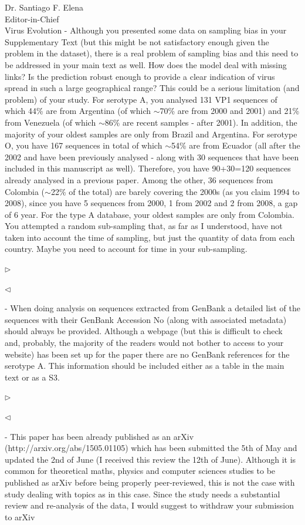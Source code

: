 \documentclass[ucla,biomath,12pt,noaddrfooter,datefrom]{UC_letter}
\newenvironment{reply}{$\triangleright$\bf}{$\triangleleft$}
\begin{document}
\begin{letter}{
Dr. Santiago F. Elena \\
Editor-in-Chief \\
Virus Evolution
}
-       Although you presented some data on sampling bias in your Supplementary Text (but this might be not satisfactory enough given the problem in the dataset), there is a real problem of sampling bias and this need to be addressed in your main text as well. 
How does the model deal with missing links? 
Is the prediction robust enough to provide a clear indication of virus spread in such a large geographical range? 
This could be a serious limitation (and problem) of your study. For serotype A, you analysed 131 VP1 sequences of which 44\% are from Argentina (of which $\sim$70\% are from 2000 and 2001) and 21\% from Venezuela (of which $\sim$86\% are recent samples - after 2001). 
In addition, the majority of your oldest samples are only from Brazil and Argentina. For serotype O, you have 167 sequences in total of which $\sim$54\% are from Ecuador (all after the 2002 and have been previously analysed - along with 30 sequences that have been included in this manuscript as well). 
Therefore, you have 90+30=120 sequences already analysed in a previous paper. 
Among the other, 36 sequences from Colombia ($\sim$22\% of the total) are barely covering the 2000s (as you claim 1994 to 2008), since you have 5 sequences from 2000, 1 from 2002 and 2 from 2008, a gap of 6 year. 
For the type A database, your oldest samples are only from Colombia. You attempted a random sub-sampling that, as far as I understood, have not taken into account the time of sampling, but just the quantity of data from each country. 
Maybe you need to account for time in your sub-sampling.

\begin{reply}

\end{reply}

-       When doing analysis on sequences extracted from GenBank a detailed list of the sequences with their GenBank Accession No (along with associated metadata) should always be provided. 
Although a webpage (but this is difficult to check and, probably, the majority of the readers would not bother to access to your website) has been set up for the paper there are no GenBank references for the serotype A. 
This information should be included either as a table in the main text or as a S3.

\begin{reply}

\end{reply}

-       This paper has been already published as an arXiv (http://arxiv.org/abs/1505.01105) which has been submitted the 5th of May and updated the 2nd of June (I received this review the 12th of June). 
Although it is common for theoretical maths, physics and computer sciences studies to be published as arXiv before being properly peer-reviewed, this is not the case with study dealing with topics as in this case. 
Since the study needs a substantial review and re-analysis of the data, I would suggest to withdraw your submission to arXiv


\end{letter}
\end{document}
